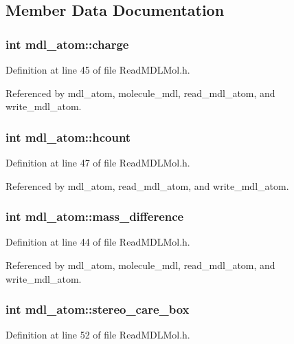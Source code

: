 \subsection{Member Data Documentation}
\subsubsection{\setlength{\rightskip}{0pt plus 5cm}int mdl\_\-atom::charge}\label{structmdl__atom_m5}




Definition at line 45 of file Read\-MDLMol.h.

Referenced by mdl\_\-atom, molecule\_\-mdl, read\_\-mdl\_\-atom, and write\_\-mdl\_\-atom.
\subsubsection{\setlength{\rightskip}{0pt plus 5cm}int mdl\_\-atom::hcount}\label{structmdl__atom_m7}




Definition at line 47 of file Read\-MDLMol.h.

Referenced by mdl\_\-atom, read\_\-mdl\_\-atom, and write\_\-mdl\_\-atom.
\subsubsection{\setlength{\rightskip}{0pt plus 5cm}int mdl\_\-atom::mass\_\-difference}\label{structmdl__atom_m4}




Definition at line 44 of file Read\-MDLMol.h.

Referenced by mdl\_\-atom, molecule\_\-mdl, read\_\-mdl\_\-atom, and write\_\-mdl\_\-atom.
\subsubsection{\setlength{\rightskip}{0pt plus 5cm}int mdl\_\-atom::stereo\_\-care\_\-box}\label{structmdl__atom_m8}




Definition at line 52 of file Read\-MDLMol.h.

